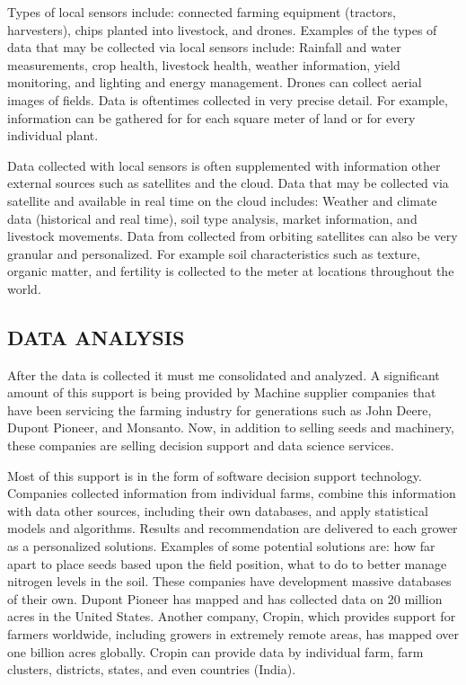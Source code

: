 \documentclass[sigconf]{acmart}
\begin{document}
Types of local sensors include: connected farming equipment (tractors, harvesters), chips planted into livestock, and drones. Examples of the types of data that may be collected via local sensors include: Rainfall and water measurements, crop health, livestock health, weather information, yield monitoring, and lighting and energy management. Drones can collect aerial images of fields. Data is oftentimes collected in very precise detail. For example, information can be gathered for for each square meter of land or for every individual plant. 

Data collected with local sensors is often supplemented with information other external sources such as satellites and the cloud. Data that may be collected via satellite and available in real time on the cloud includes: Weather and climate data (historical and real time), soil type analysis, market information, and livestock movements. Data from collected from orbiting satellites can also be very granular and personalized. For example soil characteristics such as texture, organic matter, and fertility is collected to the meter at locations throughout the world. 

\subsection{DATA ANALYSIS}

After the data is collected it must me consolidated and analyzed. A significant amount of this support is being provided by Machine supplier companies that have been servicing the farming industry for generations such as John Deere, Dupont Pioneer, and Monsanto. Now, in addition to selling seeds and machinery, these companies are selling decision support and data science services.

Most of this support is in the form of software decision support technology.  Companies collected information from individual farms, combine this information with data other sources, including their own databases, and apply statistical  models and algorithms. Results and recommendation are delivered to each grower as a personalized solutions. Examples of some potential solutions are: how far apart to place seeds based upon the field position, what to do to better manage nitrogen levels in the soil. These companies have development massive databases of their own.  Dupont Pioneer has mapped and has collected data on 20 million acres in the United States. Another company, Cropin, which provides support for farmers worldwide, including growers in extremely remote areas, has mapped over one billion acres globally. Cropin can provide data by individual farm, farm clusters, districts, states, and even countries (India).
\end{document}
